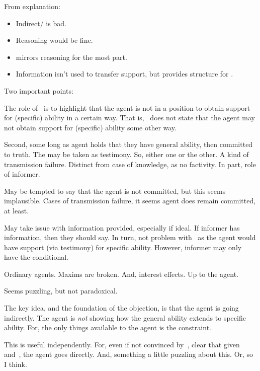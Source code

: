 \begin{note}[Overview]
  From explanation:
  \begin{itemize}
  \item Indirect/\AR{} is bad.
  \item Reasoning would be fine.
  \item \WR{} mirrors reasoning for the most part.
  \item Information isn't used to transfer support, but provides structure for \WR{}.
  \end{itemize}
\end{note}

\begin{note}
  Two important points:

  The role of~\nI{} is to highlight that the agent is not in a position to obtain support for (specific) ability in a certain way.
  That is,~\nI{} does not state that the agent may not obtain support for (specific) ability some other way.

  Second, some long as agent holds that they have general ability, then committed to truth.
  The \gen{} may be taken as testimony.
  So, either one or the other.
  A kind of transmission failure.
  Distinct from case of knowledge, as no factivity.
  In part, role of informer.

  May be tempted to say that the agent is not committed, but this seems implausible.
  Cases of transmission failure, it seems agent does remain committed, at least.

  May take issue with information provided, especially if ideal.
  If informer has information, then they should say.
  In turn, not problem with~\nI{} as the agent would have support (via testimony) for specific ability.
  However, informer may only have the conditional.

  Ordinary agents.
  Maxims are broken.
  And, interest effects.
  Up to the agent.

  Seems puzzling, but not paradoxical.
\end{note}

\begin{note}
  The key idea, and the foundation of the objection, is that the agent is going indirectly.
  The agent is \emph{not} showing how the general ability extends to specific ability.
  For, the only things available to the agent is the constraint.

  This is useful independently.
  For, even if not convinced by~\nI{}, clear that given \gsi{} and~\uRa{}, the agent goes directly.
  And, something a little puzzling about this.
  Or, so I think.
\end{note}

